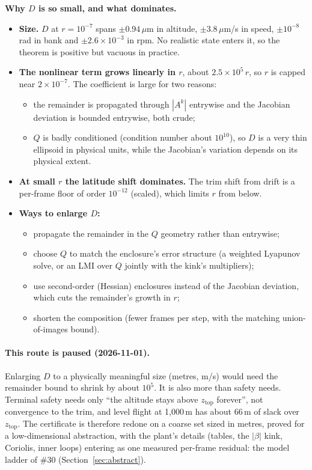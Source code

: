 \documentclass[11pt]{article}
\newcommand{\zTop}{z_{\mathrm{top}}}
\begin{document}
\textbf{Why $D$ is so small, and what dominates.}
\begin{itemize}
\item \textbf{Size.} $D$ at $r = 10^{-7}$ spans $\pm 0.94$\,$\mu$m in altitude, $\pm 3.8$\,$\mu$m/s in speed, $\pm 10^{-8}$\,rad in bank and $\pm 2.6\times10^{-3}$ in rpm. No realistic state enters it, so the theorem is positive but vacuous in practice.
\item \textbf{The nonlinear term grows linearly in $r$}, about $2.5\times10^5\,r$, so $r$ is capped near $2\times10^{-7}$. The coefficient is large for two reasons:
  \begin{itemize}
  \item the remainder is propagated through $|A^k|$ entrywise and the Jacobian deviation is bounded entrywise, both crude;
  \item $Q$ is badly conditioned (condition number about $10^{10}$), so $D$ is a very thin ellipsoid in physical units, while the Jacobian's variation depends on its physical extent.
  \end{itemize}
\item \textbf{At small $r$ the latitude shift dominates.} The trim shift from drift is a per-frame floor of order $10^{-12}$ (scaled), which limits $r$ from below.
\item \textbf{Ways to enlarge $D$:}
  \begin{itemize}
  \item propagate the remainder in the $Q$ geometry rather than entrywise;
  \item choose $Q$ to match the enclosure's error structure (a weighted Lyapunov solve, or an LMI over $Q$ jointly with the kink's multipliers);
  \item use second-order (Hessian) enclosures instead of the Jacobian deviation, which cuts the remainder's growth in $r$;
  \item shorten the composition (fewer frames per step, with the matching union-of-images bound).
  \end{itemize}
\end{itemize}

\paragraph{This route is paused (2026-11-01).} Enlarging $D$ to a physically meaningful size (metres, m/s) would need the remainder bound to shrink by about $10^5$. It is also more than safety needs. Terminal safety needs only ``the altitude stays above $\zTop$ forever'', not convergence to the trim, and level flight at 1{,}000\,m has about 66\,m of slack over $\zTop$. The certificate is therefore redone on a coarse set sized in metres, proved for a low-dimensional abstraction, with the plant's details (tables, the $|\beta|$ kink, Coriolis, inner loops) entering as one measured per-frame residual: the model ladder of \#30 (Section~\ref{sec:abstract}).
\end{document}
